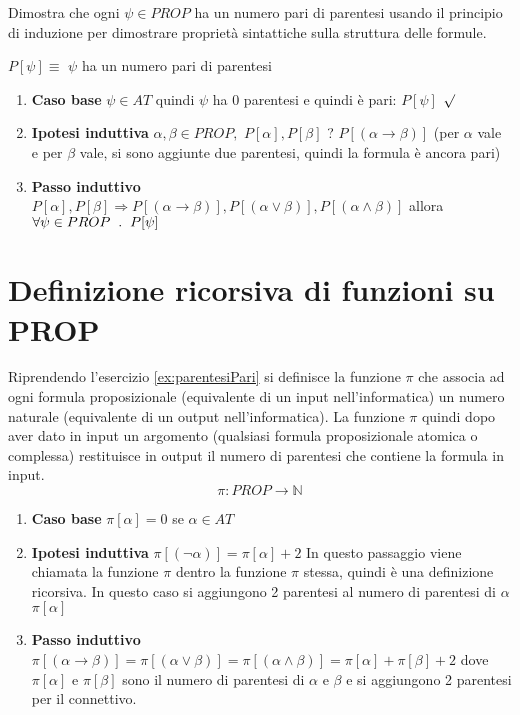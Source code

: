 \documentclass{article}
\theoremstyle{break}
\theoremstyle{break}
\theoremstyle{break}
\theoremstyle{break}
\begin{document}
\begin{exercise}
	\label{ex:parentesiPari}
	Dimostra che ogni \( \psi \in PROP \) ha un numero pari di parentesi usando
	il principio di induzione per dimostrare proprietà sintattiche sulla struttura
	delle formule.

	\( P[\psi] \equiv \) \( \psi \) ha un numero pari di parentesi
	\begin{enumerate}
		\item \textbf{Caso base} \( \psi \in AT \) quindi \( \psi \) ha 0 parentesi
		      e quindi è pari: \( P[\psi] \) \( \surd \)
		\item \textbf{Ipotesi induttiva} \( \alpha , \beta \in PROP, \) \( P[\alpha ], P[\beta ] \)
		      ? \( P[(\alpha \to \beta )] \) (per \( \alpha  \) vale e per \( \beta  \) vale, si sono
		      aggiunte due parentesi, quindi la formula è ancora pari)
		\item \textbf{Passo induttivo} \( P[\alpha], P[\beta] \Rightarrow P[(\alpha \to \beta )], P[(\alpha \vee \beta )],
		      P[(\alpha \wedge \beta)]\) allora \( \forall \psi \in PROP \hspace{2mm}.\hspace{2mm} P[\psi] \)

	\end{enumerate}
\end{exercise}

\section{Definizione ricorsiva di funzioni su PROP}
\begin{definition}
	Riprendendo l'esercizio \ref{ex:parentesiPari} si definisce la funzione \( \pi \) che associa ad ogni formula
	proposizionale (equivalente di un input nell'informatica) un numero naturale
	(equivalente di un output nell'informatica). La funzione \( \pi \) quindi dopo aver dato in input
	un argomento (qualsiasi formula proposizionale atomica o complessa) restituisce in output
	il numero di parentesi che contiene la formula in input.
	\[ \pi : PROP \to \mathbb{N} \]
	\begin{enumerate}
		\item \textbf{Caso base} \( \pi [\alpha] = 0 \) se \( \alpha \in AT \)
		\item \textbf{Ipotesi induttiva} \( \pi[(\neg \alpha)] = \pi[\alpha ] + 2 \) In questo passaggio viene
		      chiamata la funzione \( \pi \) dentro la funzione \( \pi \) stessa, quindi è una definizione
		      ricorsiva. In questo caso si aggiungono 2 parentesi al numero di parentesi di \( \alpha \) \(\pi[\alpha] \)
		\item \textbf{Passo induttivo} \( \pi[(\alpha \to \beta )] = \pi[(\alpha \vee \beta)] =
		      \pi[(\alpha \wedge \beta )] = \pi[\alpha] + \pi[\beta] + 2\) dove \( \pi[\alpha ] \) e \( \pi[\beta ] \)
		      sono il numero di parentesi di \( \alpha \) e \( \beta \) e si aggiungono 2 parentesi per
		      il connettivo.
	\end{enumerate}
\end{definition}
\end{document}
